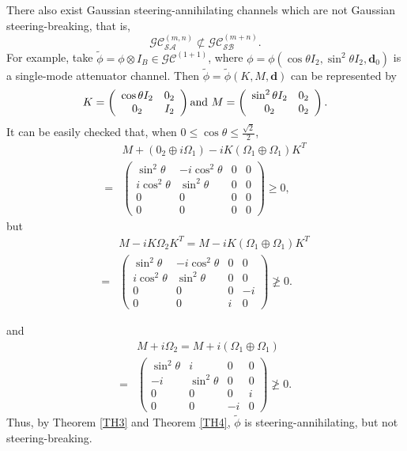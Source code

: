 \documentclass[10pt,aps,pra,amsfonts,amssymb,amsmath,%
floatfix,nofootinbib, groupedaddress,superscriptaddress,citesort,twocolumn
]{revtex4}%
\begin{document}
There also exist Gaussian steering-annihilating channels which are not Gaussian steering-breaking, that is,
$$ {\mathcal {GC}}^{(m,n)}_{\mathcal {SA}}  \not\subset  {\mathcal{GC}}^{(m+n)}_{\mathcal {SB}}.$$
For example, take  $\tilde{\phi}=\phi \otimes I_B \in {\mathcal {GC}}^{(1+1)}$,  where $\phi=\phi(\cos\theta I_2,\sin^2\theta I_2,\mathbf d_0)$ is a single-mode attenuator channel. Then $ \tilde{\phi} =\tilde{\phi}(K,M,\mathbf d) $ can be represented by
\begin{eqnarray*}
	K  =%
	\left({\begin{array}{*{20}{c}}\cos\theta I_2&0_2\\ 0_2&I_2\end{array}} \right) {\rm and}\
		M =%
		\left( {\begin{array}{*{20}{c}}\sin^2\theta I_2&0_2\\0_2&0_2\end{array}} \right).
\end{eqnarray*}
It can be easily checked that, when $0 \le \cos\theta \le \frac{\sqrt{2}}{2}$,
\begin{eqnarray*}		
&	M + ({0_2} \oplus i{\Omega _1}) - iK\left( \Omega _1 \oplus \Omega _1\right){K^T}\\
	=&\left(\begin{array}{cccc}\sin^2\theta &-i\cos^2\theta&0&0\\i\cos^2\theta&\sin^2\theta &0&0\\0&0&0&0\\
		0&0&0&0\end{array}\right)\ge 0,
\end{eqnarray*}	
 but
\begin{eqnarray*}
		&M - iK{\Omega _{2}}K^T
		 = M - iK\left( \Omega _1 \oplus \Omega_1 \right)K^T\\
		=&\left(\begin{array}{cccc}\sin^2\theta &-i\cos^2\theta&0&0\\i\cos^2\theta&\sin^2\theta&0&0\\0&0&0&-i\\
			0&0&i&0\end{array}\right)\ngeq 0.
\end{eqnarray*}	
 
 and \begin{eqnarray*}
 	&M + i{\Omega _{2}}
 	= M + i\left( \Omega _1 \oplus \Omega_1 \right)\\
 	=&\left(\begin{array}{cccc}\sin^2\theta &i&0&0\\-i&\sin^2\theta&0&0\\0&0&0&i\\
 		0&0&-i&0\end{array}\right)\ngeq 0.
 \end{eqnarray*}	
Thus, by  Theorem \ref{TH3} and Theorem \ref{TH4}, $\tilde{\phi} $ is steering-annihilating, but  not steering-breaking.
\end{document}
